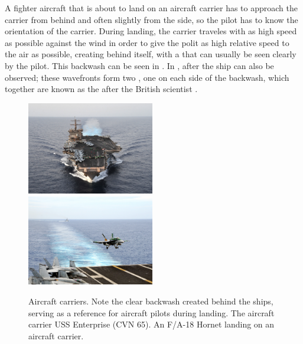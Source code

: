 A fighter aircraft that is about to land on an aircraft carrier has to approach the carrier from behind and often slightly from the side, so the pilot has to know the orientation of the carrier. During landing, the carrier traveles with as high speed as possible against the wind in order to give the polit as high relative speed to the air as possible, creating \wake behind itself, with a \backwash that can usually be seen clearly by the pilot. This backwash can be seen in . In ,  after the ship can also be observed; these wavefronts form two , one on each side of the backwash, which together are known as the  after the British scientist .

\begin{figure}
    \centering
    \subcaptionbox{\label{fig:aircraft_carrier_full_wake}} {\includegraphics[width=0.495\textwidth]{Images/Public_domain/US_Navy_110607-N-JL826-140_The_aircraft_carrier_USS_Enterprise_(CVN_65)_transits_the_Gulf_of_Aden_while_conducting_maritime_security_operations_in_}}
    \subcaptionbox{\label{fig:aircraft_carrier_landing_backwash}} {\includegraphics[width=0.495\textwidth]{Images/Public_domain/US_Navy_091113-N-6567V-068_F-A-18C_Hornet_lands_on_the_aircraft_carrier_USS_George_Washington_(CVN_73)}}
    \caption{Aircraft carriers. Note the clear backwash created behind the ships, serving as a reference for aircraft pilots during landing.  The aircraft carrier USS Enterprise (CVN 65).  An F/A-18 Hornet landing on an aircraft carrier.}
    \label{fig:aircraft_carriers_and_backwash}
\end{figure}


